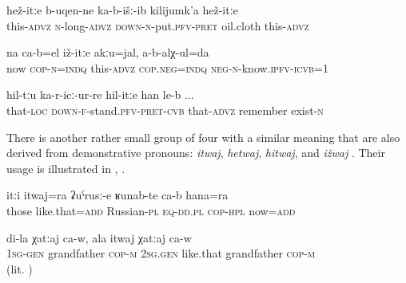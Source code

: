 \begin{exe}
	\ex	\label{ex:Like this alongside we put the oil cloth}
	\gll	hež-itːe	b-uqen-ne	ka-b-išː-ib	kilijumk'a	hež-itːe  \\
		this-\textsc{advz}	\textsc{n}-long-\textsc{advz}	\textsc{down-n}-put.\textsc{pfv}-\textsc{pret}	oil.cloth	this-\textsc{advz}\\
	\glt	{}

	\ex	\label{ex:‎‎I do not know whether it was like this or not}
	\gll	na	ca-b=el	iž-itːe	akːu=jal,	a-b-alχ-ul=da  \\
		now	\textsc{cop}-\textsc{n}=\textsc{indq}	this-\textsc{advz}	\textsc{cop.neg}=\textsc{indq}	\textsc{neg}-\textsc{n}-know.\textsc{ipfv}-\textsc{icvb}=1\\
	\glt	{}

	\ex	\label{ex:‎‎I remember like I was standing there like that}
	\gll	hil-tːu	ka-r-icː-ur-re	hil-itːe	han	le-b  ...\\
		that-\textsc{loc}	\textsc{down-f}-stand.\textsc{pfv}-\textsc{pret}-\textsc{cvb}	that-\textsc{advz}	remember	exist-\textsc{n}\\
	\glt	{}
\end{exe}

There is another rather small group of four  with a similar meaning that are also derived from demonstrative pronouns: \textit{itwaj}, \textit{hetwaj}, \textit{hitwaj}, and \textit{ižwaj} . Their usage is illustrated in , .

\begin{exe}
		\ex	\label{ex:They are also like this like Russians even now}
		\gll	itːi	itwaj=ra	ʡuˁrusː-e	ʁunab-te	ca-b	hana=ra  \\
			those	like.that=\textsc{add}	Russian-\textsc{pl}	\textsc{eq-dd.pl} 	\textsc{cop-hpl}	now=\textsc{add}\\
		\glt	{}

		\ex	\label{ex:he is my real grandfather}
		\gll	di-la	χatːaj	ca-w,	ala	itwaj	χatːaj	ca-w   \\
			1\textsc{sg}-\textsc{gen}	grandfather	\textsc{cop-m}	2\textsc{sg}.\textsc{gen}	like.that grandfather	\textsc{cop-m}\\
		\glt	{} (lit. )
\end{exe}

